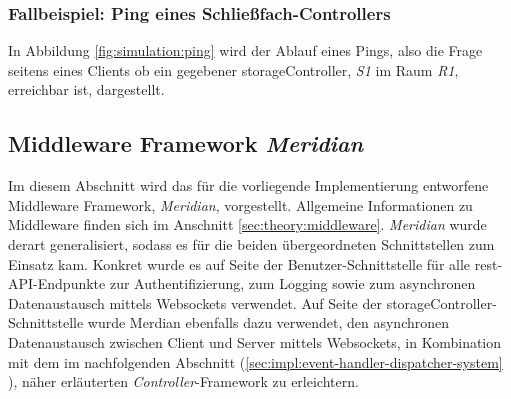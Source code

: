\newpage
\subsubsection{Fallbeispiel: Ping eines Schließfach-Controllers}
In Abbildung \ref{fig:simulation:ping} wird der Ablauf eines Pings, also die Frage seitens eines Clients ob ein gegebener \gls{storageController}, \textit{S1} im Raum \textit{R1}, erreichbar ist, dargestellt.
\vspace*{\fill}
\begin{center}
    \label{fig:simulation:ping}
\end{center}
\vspace*{\fill}

\newpage
\subsection{Middleware Framework \textit{Meridian}}\label{sec:impl:merdian}
Im diesem Abschnitt wird das für die vorliegende Implementierung entworfene Middleware Framework, \textit{Meridian}, vorgestellt. Allgemeine Informationen zu Middleware finden sich im Anschnitt \ref{sec:theory:middleware}. \textit{Meridian} wurde derart generalisiert, sodass es für die beiden übergeordneten Schnittstellen zum Einsatz kam. Konkret wurde es auf Seite der Benutzer-Schnittstelle für alle \acrshort{rest}-API-Endpunkte zur Authentifizierung, zum Logging sowie zum asynchronen Datenaustausch mittels Websockets verwendet. Auf Seite der \gls{storageController}-Schnittstelle wurde Merdian ebenfalls dazu verwendet, den asynchronen Datenaustausch zwischen Client und Server mittels Websockets, in Kombination mit dem im nachfolgenden Abschnitt (\ref{sec:impl:event-handler-dispatcher-system} ), näher erläuterten \textit{Controller}-Framework zu erleichtern.

